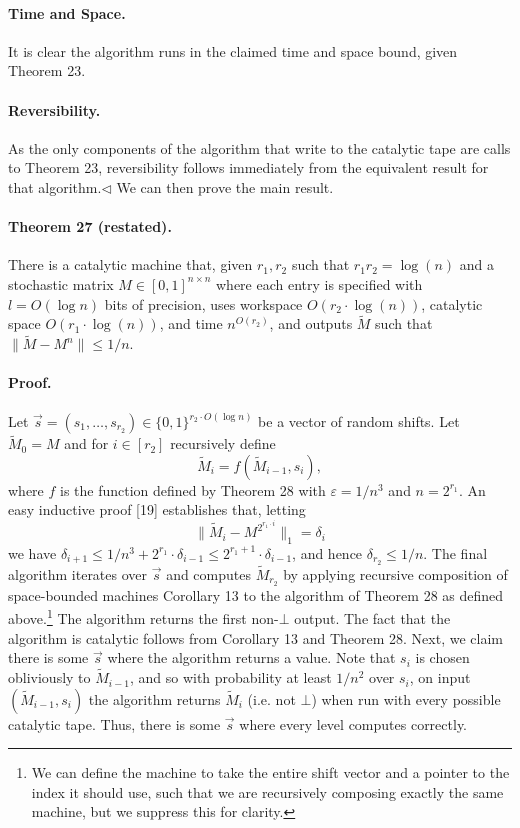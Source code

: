 \paragraph{Time and Space.} It is clear the algorithm runs in the claimed time and space bound, given Theorem 23.
\paragraph{Reversibility.} As the only components of the algorithm that write to the catalytic tape are calls to Theorem 23, reversibility follows immediately from the equivalent result for that algorithm.\hfill$\triangleleft$
We can then prove the main result.
\paragraph{Theorem 27 (restated).} There is a catalytic machine that, given $r_1,r_2$ such that $r_1r_2=\log(n)$ and a stochastic matrix $M\in[0,1]^{n\times n}$ where each entry is specified with $l=O(\log n)$ bits of precision, uses workspace $O(r_2\cdot\log(n))$, catalytic space $O(r_1\cdot\log(n))$, and time $n^{O(r_2)}$, and outputs $\widetilde M$ such that $\|\widetilde M-M^n\|\leq1/n$.
\paragraph{Proof.} Let $\vec s=(s_1,\ldots,s_{r_2})\in\{0,1\}^{r_2\cdot O(\log n)}$ be a vector of random shifts. Let $\widetilde M_0=M$ and for $i\in[r_2]$ recursively define
\[\widetilde M_i=f(\widetilde M_{i-1},s_i),\]
where $f$ is the function defined by Theorem 28 with $\varepsilon=1/n^3$ and $n=2^{r_1}$. An easy inductive proof [19] establishes that, letting
\[\|\widetilde M_i-M^{2^{r_1\cdot i}}\|_1=\delta_i\]
we have $\delta_{i+1}\leq1/n^3+2^{r_1}\cdot\delta_{i-1}\leq2^{r_1+1}\cdot\delta_{i-1}$, and hence $\delta_{r_2}\leq1/n$.
The final algorithm iterates over $\vec s$ and computes $\widetilde M_{r_2}$ by applying recursive composition of space-bounded machines Corollary 13 to the algorithm of Theorem 28 as defined above.\footnote{We can define the machine to take the entire shift vector and a pointer to the index it should use, such that we are recursively composing exactly the same machine, but we suppress this for clarity.} The algorithm returns the first non-$\bot$ output. The fact that the algorithm is catalytic follows from Corollary 13 and Theorem 28. Next, we claim there is some $\vec s$ where the algorithm returns a value. Note that $s_i$ is chosen obliviously to $\widetilde M_{i-1}$, and so with probability at least $1/n^2$ over $s_i$, on input $(\widetilde M_{i-1},s_i)$ the algorithm returns $\widetilde M_i$ (i.e. not $\bot$) when run with every possible catalytic tape. Thus, there is some $\vec s$ where every level computes correctly.
